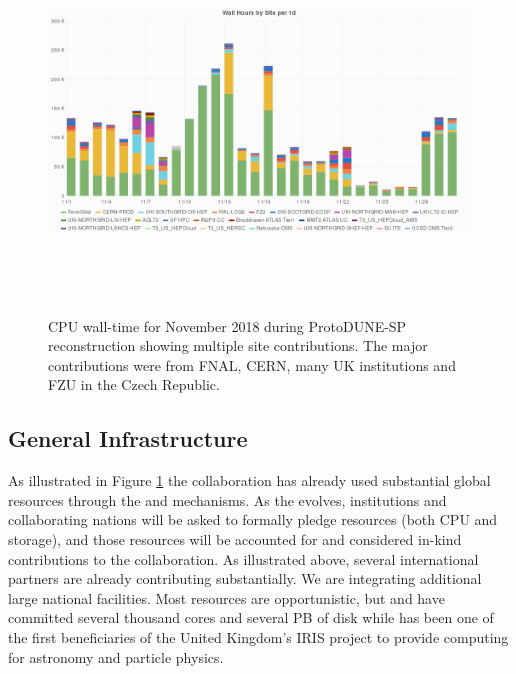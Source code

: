 
\begin{figure}[htp]
\centering
\includegraphics[height=4in]{graphics/comp-vo-summary.png}

\caption{CPU wall-time for November 2018 during ProtoDUNE-SP reconstruction showing multiple site contributions.  The major contributions were from FNAL, CERN, many UK institutions and FZU in the Czech Republic.}
\label{fig:ch-exec-comp-cpupie}
\end{figure}


\subsection{General Infrastructure}
As illustrated in Figure \ref{fig:ch-exec-comp-cpupie} the collaboration has already used substantial global resources through the  and  mechanisms. As the  evolves, institutions and collaborating nations will be asked to formally pledge resources (both CPU and storage), and those resources will be accounted for and considered in-kind contributions to the collaboration.
As illustrated above, several international partners are already contributing substantially. We are integrating additional large national facilities. Most resources are opportunistic, but  and  have committed several thousand cores and several PB of disk while  has been one of the first beneficiaries of the United Kingdom's IRIS project to provide computing for astronomy and particle physics.  

